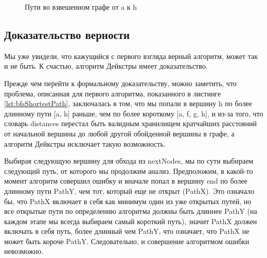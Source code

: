 \documentclass[../article.tex]{subfiles}
\begin{document}
\begin{figure}
    \caption{Пути во взвешенном графе от {\firacodebold a} к {\firacodebold h}}
    \label{fig:dijkstraProve}
\end{figure}

\subsection{Доказательство верности}

Мы уже увидели, что кажущийся с первого взгляда верный алгоритм, может так и не быть. К счастью, алгоритм Дейкстры имеет доказательство.

Прежде чем перейти к формальному доказательству, можно заметить, что проблема, описанная для первого алгоритма, показанного в листинге \ref{lst:bfsShortestPath}, заключалась в том, что мы попали в вершину h по более длинному пути [a, h] раньше, чем по более короткому [a, f, g, h], и из-за того, что словарь distances перестал быть валидным хранилищем кратчайших расстояний от начальной вершины до любой другой обойденной вершины в графе, а алгоритм Дейкстры исключает такую возможность.

Выбирая следующую вершину для обхода из nextNodes, мы по сути выбираем следующий путь, от которого мы продолжим анализ. Предположим, в какой-то момент алгоритм совершил ошибку и вначале попал в вершину end по более длинному пути PathY, чем тот, который еще не открыт (PathX). Это означало бы, что PathX включает в себя как минимум один из уже открытых путей, но все открытые пути по определению алгоритма должны быть длиннее PathY (на каждом этапе мы всегда выбираем самый короткий путь), значит PathX должен включать в себя путь, более длинный чем PathY, что означает, что PathX не может быть короче PathY. Следовательно, и совершение алгоритмом ошибки невозможно.
\end{document}
